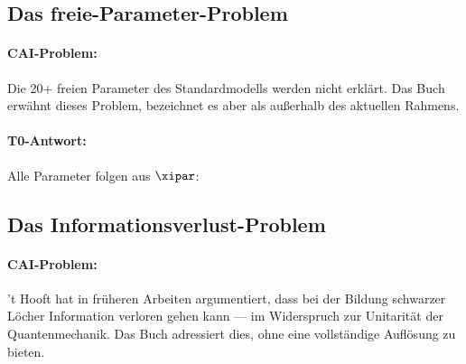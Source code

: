\subsection{Das freie-Parameter-Problem}

\paragraph{CAI-Problem:} Die 20+ freien Parameter des Standardmodells werden
nicht erklärt. Das Buch erwähnt dieses Problem, bezeichnet es aber als
außerhalb des aktuellen Rahmens.

\paragraph{T0-Antwort:} Alle Parameter folgen aus $\xipar$:
\begin{table}[h]
    \centering
    \caption{Freie Parameter des Standardmodells in T0}
    \label{tab:sm_parameters}
\end{table}

\subsection{Das Informationsverlust-Problem}

\paragraph{CAI-Problem:} 't Hooft hat in früheren Arbeiten argumentiert, dass
bei der Bildung schwarzer Löcher Information verloren gehen kann — im Widerspruch
zur Unitarität der Quantenmechanik. Das Buch adressiert dies, ohne eine
vollständige Auflösung zu bieten.


